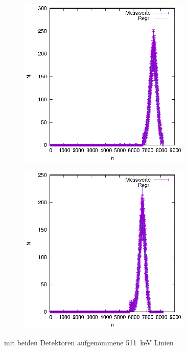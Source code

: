 \begin{figure}[h]
  \centering
  \begin{subfigure}[h]{0.5\textwidth}
    \centering
    \includegraphics[width=0.9\textwidth]{data/Energiespektren/na_kal_links.eps}
    \label{fig:511_links}
  \end{subfigure}%
  \begin{subfigure}[h]{0.5\textwidth}
    \centering
    \includegraphics[width=0.9\textwidth]{data/Energiespektren/na_kal_rechts.eps}
    \label{fig:511_rechts}
  \end{subfigure}
  \caption{mit beiden Detektoren aufgenommene \SI{511}{\kilo\electronvolt} Linien}
  \label{fig:511}
\end{figure}


